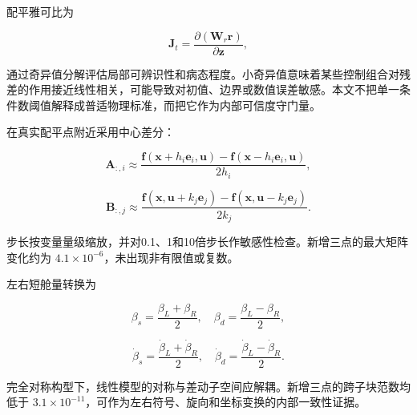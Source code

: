 \documentclass[UTF8,11pt,oneside,openany,fontset=windows]{ctexbook}
\begin{document}
配平雅可比为

\[\mathbf{J}_t=\frac{\partial(\mathbf{W}_r\mathbf{r})}{\partial\mathbf{z}},\]

通过奇异值分解评估局部可辨识性和病态程度。小奇异值意味着某些控制组合对残差的作用接近线性相关，可能导致对初值、边界或数值误差敏感。本文不把单一条件数阈值解释成普适物理标准，而把它作为内部可信度守门量。

在真实配平点附近采用中心差分：

\[\mathbf{A}_{:,i}\approx
\frac{\mathbf{f}(\mathbf{x}+h_i\mathbf{e}_i,\mathbf{u})
-\mathbf{f}(\mathbf{x}-h_i\mathbf{e}_i,\mathbf{u})}{2h_i},\]

\[\mathbf{B}_{:,j}\approx
\frac{\mathbf{f}(\mathbf{x},\mathbf{u}+k_j\mathbf{e}_j)
-\mathbf{f}(\mathbf{x},\mathbf{u}-k_j\mathbf{e}_j)}{2k_j}.\]

步长按变量量级缩放，并对0.1、1和10倍步长作敏感性检查。新增三点的最大矩阵变化约为
\(4.1\times10^{-6}\)，未出现非有限值或复数。

左右短舱量转换为

\[\beta_s=\frac{\beta_L+\beta_R}2,\quad
\beta_d=\frac{\beta_L-\beta_R}2,\]

\[\dot\beta_s=\frac{\dot\beta_L+\dot\beta_R}2,\quad
\dot\beta_d=\frac{\dot\beta_L-\dot\beta_R}2.\]

完全对称构型下，线性模型的对称与差动子空间应解耦。新增三点的跨子块范数均低于
\(3.1\times10^{-11}\)，可作为左右符号、旋向和坐标变换的内部一致性证据。
\end{document}
